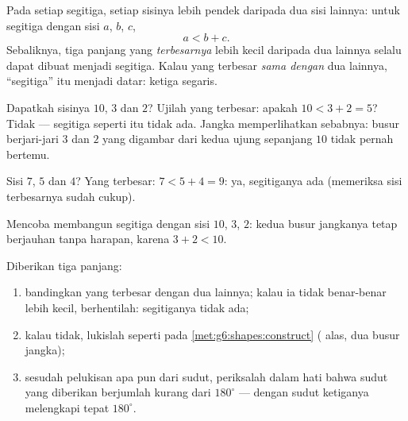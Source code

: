 \begin{theorem}\label{thm:g7:triangles:inequality}
Pada setiap segitiga, setiap sisinya lebih pendek daripada  dua
sisi lainnya: untuk segitiga dengan sisi $a$, $b$, $c$,
\[
a < b + c .
\]
Sebaliknya, tiga panjang yang \emph{terbesarnya} lebih kecil daripada
 dua lainnya selalu dapat dibuat menjadi segitiga. Kalau yang
terbesar \emph{sama dengan}  dua lainnya, ``segitiga'' itu
menjadi datar: ketiga  segaris.
\end{theorem}
\admitted

\begin{example}\label{ex:g7:triangles:inequality}
Dapatkah sisinya $10$, $3$ dan $2$? Ujilah yang terbesar: apakah
$10 < 3 + 2 = 5$? Tidak --- segitiga seperti itu tidak ada. Jangka
memperlihatkan sebabnya: busur berjari-jari $3$ dan $2$ yang digambar
dari kedua ujung  sepanjang $10$ tidak pernah bertemu.

Sisi $7$, $5$ dan $4$? Yang terbesar: $7 < 5 + 4 = 9$: ya, segitiganya
ada (memeriksa sisi terbesarnya sudah cukup).
\end{example}

\begin{omfigure}

{\small Mencoba membangun segitiga dengan sisi $10$, $3$, $2$: kedua
busur jangkanya tetap berjauhan tanpa harapan, karena $3 + 2 < 10$.}
\end{omfigure}

\begin{method}\label{met:g7:triangles:construct}
Diberikan tiga panjang:
\begin{enumerate}
  \item bandingkan yang terbesar dengan  dua lainnya; kalau ia
        tidak benar-benar lebih kecil, berhentilah: segitiganya tidak
        ada;
  \item kalau tidak, lukislah seperti pada
        \cref{met:g6:shapes:construct} ( alas, dua busur
        jangka);
  \item sesudah pelukisan apa pun dari sudut, periksalah dalam hati
        bahwa sudut yang diberikan berjumlah kurang dari $180^\circ$
        --- dengan sudut ketiganya melengkapi tepat $180^\circ$.
\end{enumerate}
\end{method}

